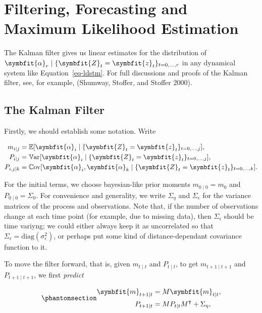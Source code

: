 \documentclass[
]{report}
\DeclareMathOperator{\var}{\mathbb{V}\mathrm{ar}}
\DeclareMathOperator{\cov}{\mathbb{C}\mathrm{ov}}
\newcommand{\bv}[1]{\symbfit{#1}}
\theoremstyle{plain}
\theoremstyle{plain}
\theoremstyle{plain}
\theoremstyle{remark}
\begin{document}
\chapter{Filtering, Forecasting and Maximum Likelihood
Estimation}\label{filtering-forecasting-and-maximum-likelihood-estimation}

The Kalman filter gives us linear estimates for the distribution of
\(\bv\alpha_r\mid \{\bv Z_t=\bv z_t\}_{t=0,...,r}\) in any dynamical
system like Equation~\ref{eq-ldstm}. For full discussions and proofs of
the Kalman filter, see, for example, (Shumway, Stoffer, and Stoffer
2000).

\section{The Kalman Filter}\label{sec-kalmanfilter}

Firstly, we should establish some notation. Write

\[\begin{split}
m_{i \mid j} &= \mathbb E[\bv\alpha_i \mid \{\bv Z_t=\bv z_t\}_{t=0,\dots,j}],\\
P_{i \mid j} &= \var[\bv\alpha_i \mid \{\bv Z_t=\bv z_t\}_{t=0,\dots,j}],\\
P_{i,j \mid k} &= \cov[\bv\alpha_i, \bv\alpha_k \mid \{\bv Z_t=\bv z_t\}_{t=0,\dots,k}].
\end{split}
\]

For the initial terms, we choose bayesian-like prior moments
\(m_{0\mid0}=m_0\) and \(P_{0\mid0}=\Sigma_0\). For convenience and
generality, we write \(\Sigma_\eta\) and \(\Sigma_\epsilon\) for the
variance matrices of the process and observations. Note that, if the
number of observations change at each time point (for example, due to
missing data), then \(\Sigma_\epsilon\) should be time variyng; we could
either always keep it as uncorrelated so that
\(\Sigma_\epsilon = \mathrm{diag} (\sigma_\epsilon^2)\), or perhaps put
some kind of distance-dependant covariance function to it.

To move the filter forward, that is, given \(m_{t\mid t}\) and
\(P_{t\mid t}\), to get \(m_{t+1\mid t+1}\) and \(P_{t+1\mid t+1}\), we
first \emph{predict}

\begin{equation}\phantomsection\label{eq-kalman-predict}{\begin{split}
\bv m_{t+1\mid t} &= M \bv m_{t\mid t},\\
P_{t+1\mid t} &= M P_{t\mid t} M^\intercal + \Sigma_\eta,
\end{split}
}\end{equation}
\end{document}
